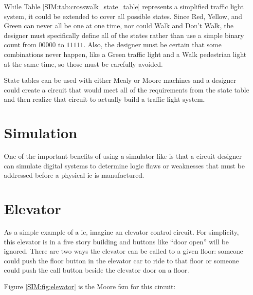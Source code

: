While Table \ref{SIM:tab:crosswalk_state_table} represents a simplified traffic light system, it could be extended to cover all possible states. Since Red, Yellow, and Green can never all be one at one time, nor could Walk and Don't Walk, the designer must specifically define all of the states rather than use a simple binary count from $ 00000 $ to $ 11111 $. Also, the designer must be certain that some combinations never happen, like a Green traffic light and a Walk pedestrian light at the same time, so those must be carefully avoided. 

State tables can be used with either Mealy or Moore machines and a designer could create a circuit that would meet all of the requirements from the state table and then realize that circuit to actually build a traffic light system. 


\section{Simulation}

One of the important benefits of using a simulator like \Le is that a circuit designer can simulate digital systems to determine logic flaws or weaknesses that must be addressed before a physical \gls{ic} is manufactured.

\section{Elevator}

As a simple example of a \gls{ic}, imagine an elevator control circuit. For simplicity, this elevator is in a five story building and buttons like ``door open'' will be ignored. There are two ways the elevator can be called to a given floor: someone could push the floor button in the elevator car to ride to that floor or someone could push the call button beside the elevator door on a floor.

Figure \ref{SIM:fig:elevator} is the Moore \gls{fsm} for this circuit:

